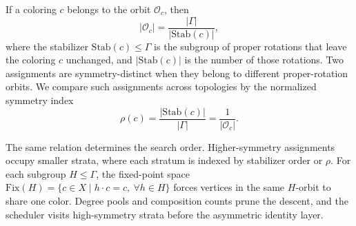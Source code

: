 \documentclass[pdflatex,sn-mathphys-num]{sn-jnl}
\theoremstyle{thmstyleone}%
\begin{document}
If a coloring $c$ belongs to the orbit $\mathcal{O}_c$, then
\begin{equation}
|\mathcal{O}_c| = \frac{|\Gamma|}{|\mathrm{Stab}(c)|},
\end{equation}
where the stabilizer $\mathrm{Stab}(c)\le\Gamma$ is the subgroup of proper rotations that leave the coloring $c$ unchanged, and $|\mathrm{Stab}(c)|$ is the number of those rotations. Two assignments are symmetry-distinct when they belong to different proper-rotation orbits. We compare such assignments across topologies by the normalized symmetry index
\begin{equation}
\rho(c)=\frac{|\mathrm{Stab}(c)|}{|\Gamma|}=\frac{1}{|\mathcal{O}_c|}.
\end{equation}

The same relation determines the search order. Higher-symmetry assignments occupy smaller strata, where each stratum is indexed by stabilizer order or $\rho$. For each subgroup $H \le \Gamma$, the fixed-point space $\mathrm{Fix}(H)=\{c \in X \mid h\cdot c=c,\ \forall h\in H\}$ forces vertices in the same $H$-orbit to share one color. Degree pools and composition counts prune the descent, and the scheduler visits high-symmetry strata before the asymmetric identity layer.
\end{document}
